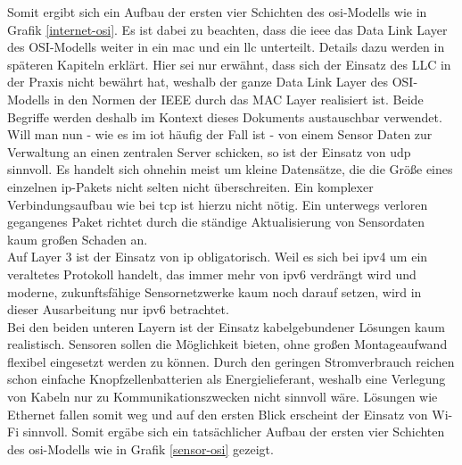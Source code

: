 Somit ergibt sich ein Aufbau der ersten vier Schichten des \ac{osi}-Modells wie in Grafik \ref{internet-osi}. Es ist dabei zu beachten, dass die \ac{ieee} das Data Link Layer des OSI-Modells weiter in ein \ac{mac} und ein \ac{llc} unterteilt. Details dazu werden in späteren Kapiteln erklärt. Hier sei nur erwähnt, dass sich der Einsatz des LLC in der Praxis nicht bewährt hat, weshalb der ganze Data Link Layer des OSI-Modells in den Normen der IEEE durch das MAC Layer realisiert ist. Beide Begriffe werden deshalb im Kontext dieses Dokuments austauschbar verwendet.\\
Will man nun - wie es im \ac{iot} häufig der Fall ist - von einem Sensor Daten zur Verwaltung an einen zentralen Server schicken, so ist der Einsatz von \ac{udp} sinnvoll. Es handelt sich ohnehin meist um kleine Datensätze, die die Größe eines einzelnen \ac{ip}-Pakets nicht selten nicht überschreiten. Ein komplexer Verbindungsaufbau wie bei \ac{tcp} ist hierzu nicht nötig. Ein unterwegs verloren gegangenes Paket richtet durch die ständige Aktualisierung von Sensordaten kaum großen Schaden an.\\
Auf Layer 3 ist der Einsatz von \ac{ip} obligatorisch. Weil es sich bei \ac{ipv4} um ein veraltetes Protokoll handelt, das immer mehr von \ac{ipv6} verdrängt wird und moderne, zukunftsfähige Sensornetzwerke kaum noch darauf setzen, wird in dieser Ausarbeitung nur \ac{ipv6} betrachtet.\\
Bei den beiden unteren Layern ist der Einsatz kabelgebundener Lösungen kaum realistisch. Sensoren sollen die Möglichkeit bieten, ohne großen Montageaufwand flexibel eingesetzt werden zu können. Durch den geringen Stromverbrauch reichen schon einfache Knopfzellenbatterien als Energielieferant, weshalb eine Verlegung von Kabeln nur zu Kommunikationszwecken nicht sinnvoll wäre. Lösungen wie Ethernet fallen somit weg und auf den ersten Blick erscheint der Einsatz von Wi-Fi sinnvoll. Somit ergäbe sich ein tatsächlicher Aufbau der ersten vier Schichten des \ac{osi}-Modells wie in Grafik \ref{sensor-osi} gezeigt. \\
